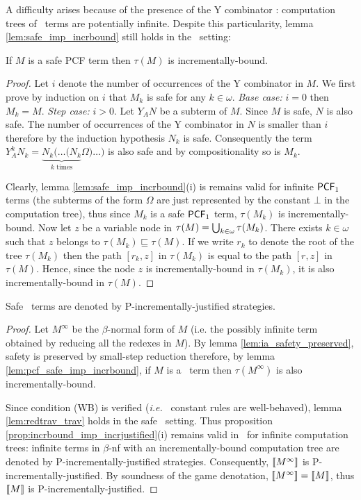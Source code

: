 A difficulty arises because of the presence of the Y combinator :
computation trees of \pcf\ terms are potentially infinite. Despite
this particularity, lemma \ref{lem:safe_imp_incrbound} still holds
in the \pcf\ setting:
\begin{lem} \label{lem:pcf_safe_imp_incrbound} If $M$ is a safe
PCF term then $\tau(M)$ is incrementally-bound.
\end{lem}
\begin{proof}
Let $i$ denote the number of occurrences of the Y combinator in $M$.
We first prove by induction on $i$ that $M_k$ is safe for any $k\in
\omega$. \emph{Base case:} $i=0$ then $M_k = M$. \emph{Step case:}
$i>0$. Let $Y_A N$ be a subterm of $M$. Since $M$ is safe, $N$ is
also safe. The number of occurrences of the Y combinator in $N$ is
smaller than $i$ therefore by the induction hypothesis $N_k$ is
safe. Consequently the term $Y_A^k N_k = \underbrace{N_k ( \ldots (
N_k}_{k \mbox{ times}} \Omega ) \ldots )$ is also safe and by
compositionality so is $M_k$.

Clearly, lemma \ref{lem:safe_imp_incrbound}(i) is remains valid for infinite 
$\textsf{PCF}_1$ terms (the subterms of the form $\Omega$ are just represented by
the constant $\bot$ in the computation tree), thus since $M_k$
is a safe $\textsf{PCF}_1$ term, $\tau(M_k)$ is incrementally-bound.
Now let $z$ be a variable node in $\tau(M) =
\bigcup_{k\in\omega} \tau(M_k)$. There exists $k\in \omega$ such
that $z$ belongs to $\tau(M_k) \sqsubseteq \tau(M)$. 
If we write $r_k$ to denote the root of the tree $\tau(M_k)$ then the path $[r_k,z]$ in $\tau(M_k)$ is equal to the path $[r,z]$ in $\tau(M)$.
Hence, since the node $z$ is incrementally-bound in $\tau(M_k)$,
it is also incrementally-bound in $\tau(M)$.
\end{proof}


\begin{thm}
Safe \pcf\ terms are denoted by P-incrementally-justified strategies.
\end{thm}
\begin{proof}
Let $M^{\infty}$ be the $\beta$-normal form of $M$ (i.e. the possibly infinite term obtained by reducing all the redexes in $M$). By lemma \ref{lem:ia_safety_preserved}, safety is preserved by small-step reduction therefore, by lemma \ref{lem:pcf_safe_imp_incrbound}, if $M$ is a \pcf\ term then $\tau(M^{\infty})$ is also 
incrementally-bound.

Since condition (WB) is verified ({\it i.e.} \pcf\ constant rules are well-behaved), lemma \ref{lem:redtrav_trav} holds in the safe \pcf\ setting.
Thus proposition \ref{prop:incrbound_imp_incrjustified}(i) remains valid
in \pcf\ for infinite computation trees: infinite terms in $\beta$-nf
with an incrementally-bound computation tree are denoted
by P-incrementally-justified strategies. Consequently, ${[\![ M^{\infty} ]\!]}$
is P-incrementally-justified.
By soundness of the game denotation, ${[\![ M^{\infty} ]\!]} = {[\![ M ]\!]}$, thus ${[\![ M ]\!]}$ is P-incrementally-justified.
\end{proof}

